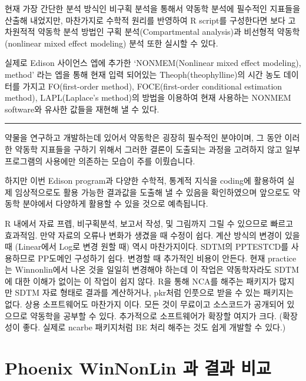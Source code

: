 \documentclass[
  12pt,
]{krantz}
\begin{document}
현재 가장 간단한 분석 방식인 비구획 분석을 통해서 약동학 분석에 필수적인 지표들을 산출해 내었지만, 마찬가지로 수학적 원리를 반영하여 R script를 구성한다면 보다 고차원적적 약동학 분석 방법인 구획 분석(Compartmental analysis)과 비선형적 약동학(nonlinear mixed effect modeling) 분석 또한 실시할 수 있다.

실제로 Edison 사이언스 엡에 추가한 `NONMEM(Nonlinear mixed effect modeling), method' 라는 엡을 통해 현재 입력 되어있는 Theoph(theophylline)의 시간 농도 데이터를 가지고 FO(first-order method), FOCE(first-order conditional estimation method), LAPL(Laplace's method)의 방법을 이용하여 현재 사용하는 NONMEM software와 유사한 값들을 재현해 낼 수 있다.

\begin{center}\rule{0.5\linewidth}{0.5pt}\end{center}

약물을 연구하고 개발하는데 있어서 약동학은 굉장히 필수적인 분야이며, 그 동안 이러한 약동학 지표들을 구하기 위해서 그러한 결론이 도출되는 과정을 고려하지 않고 일부 프로그램의 사용에만 의존하는 모습이 주를 이뤘습니다.

하지만 이번 Edison program과 다양한 수학적, 통계적 지식을 coding에 활용하여 실제 임상적으로도 활용 가능한 결과값을 도출해 낼 수 있음을 확인하였으며 앞으로도 약동학 분야에서 다양하게 활용할 수 있을 것으로 예측됩니다.

R 내에서 자료 프렙, 비구획분석, 보고서 작성, 및 그림까지 그릴 수 있으므로 빠르고 효과적임. 만약 자료의 오류나 변화가 생겼을 때 수정이 쉽다. 계산 방식의 변경이 있을때 (Linear에서 Log로 변경 원할 때) 역시 마찬가지이다.
SDTM의 PPTESTCD를 사용하므로 PP도메인 구성하기 쉽다. 변경할 때 추가적인 비용이 안든다. 현재 practice는 Winnonlin에서 나온 것을 일일히 변경해야 하는데 이 작업은 약동학자라도 SDTM에 대한 이해가 없이는 이 작업이 쉽지 않다. R을 통해 NCA를 해주는 패키지가 많지만 SDTM 자료 형태로 결과를 계산하거나, pkr처럼 인풋으로 받을 수 있는 패키지는 없다. 상용 소프트웨어도 마찬가지 이다.
모든 것이 무료이고 소스코드가 공개되어 있으므로 약동학을 공부할 수 있다. 추가적으로 소프트웨어가 확장할 여지가 크다. (확장성이 좋다. 실제로 ncarbe 패키지처럼 BE 처리 해주는 것도 쉽게 개발할 수 있다.)

\cleardoublepage

\hypertarget{appendix-appendix}{%
\appendix {}}


\hypertarget{wnl-comparison}{%
\chapter{Phoenix WinNonLin 과 결과 비교}\label{wnl-comparison}}
\end{document}
